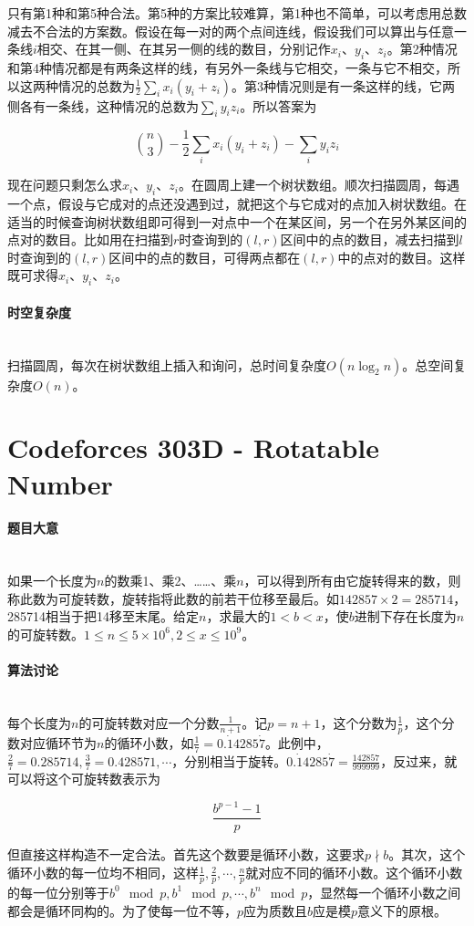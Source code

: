\documentclass[UTF8]{ctexart}
\newcommand{\myparagraph}[1]{\paragraph{#1}\mbox{}\\}
\theoremstyle{nonumberplain}
\begin{document}
			只有第1种和第5种合法。第5种的方案比较难算，第1种也不简单，可以考虑用总数减去不合法的方案数。假设在每一对的两个点间连线，假设我们可以算出与任意一条线$i$相交、在其一侧、在其另一侧的线的数目，分别记作$x_i$、$y_i$、$z_i$。第2种情况和第4种情况都是有两条这样的线，有另外一条线与它相交，一条与它不相交，所以这两种情况的总数为$\frac{1}{2}\sum_i x_i(y_i+z_i)$。第3种情况则是有一条这样的线，它两侧各有一条线，这种情况的总数为$\sum_i y_i z_i$。所以答案为
			
			$$ \binom{n}{3}-\frac{1}{2}\sum_i x_i(y_i+z_i)-\sum_i y_i z_i $$
			
			现在问题只剩怎么求$x_i$、$y_i$、$z_i$。在圆周上建一个树状数组。顺次扫描圆周，每遇一个点，假设与它成对的点还没遇到过，就把这个与它成对的点加入树状数组。在适当的时候查询树状数组即可得到一对点中一个在某区间，另一个在另外某区间的点对的数目。比如用在扫描到$r$时查询到的$(l,r)$区间中的点的数目，减去扫描到$l$时查询到的$(l,r)$区间中的点的数目，可得两点都在$(l,r)$中的点对的数目。这样既可求得$x_i$、$y_i$、$z_i$。
		
		\myparagraph{时空复杂度}
		
			扫描圆周，每次在树状数组上插入和询问，总时间复杂度$O(n\log_2n)$。总空间复杂度$O(n)$。
	
	\section{Codeforces 303D - Rotatable Number}
	
		\myparagraph{题目大意}
		
			如果一个长度为$n$的数乘1、乘2、……、乘$n$，可以得到所有由它旋转得来的数，则称此数为可旋转数，旋转指将此数的前若干位移至最后。如$142857 \times 2=285714$，285714相当于把14移至末尾。给定$n$，求最大的$1<b<x$，使$b$进制下存在长度为$n$的可旋转数。$1 \leq n \leq 5 \times 10^6, 2 \leq x \leq 10^9$。
		
		\myparagraph{算法讨论}
		
			每个长度为$n$的可旋转数对应一个分数$\frac{1}{n+1}$。记$p=n+1$，这个分数为$\frac{1}{p}$，这个分数对应循环节为$n$的循环小数，如$\frac{1}{7}=0.\dot{1}4285\dot{7}$。此例中，$\frac{2}{7}=0.285714, \frac{3}{7}=0.428571, \cdots$，分别相当于旋转。$0.\dot{1}4285\dot{7}=\frac{142857}{999999}$，反过来，就可以将这个可旋转数表示为
			
			$$\frac{b^{p-1}-1}{p}$$
			
			但直接这样构造不一定合法。首先这个数要是循环小数，这要求$p \nmid b$。其次，这个循环小数的每一位均不相同，这样$\frac{1}{p}, \frac{2}{p}, \cdots, \frac{n}{p}$就对应不同的循环小数。这个循环小数的每一位分别等于$b^0 \mod p, b^1 \mod p, \cdots, b^n \mod p$，显然每一个循环小数之间都会是循环同构的。为了使每一位不等，$p$应为质数且$b$应是模$p$意义下的原根。
			
\end{document}
